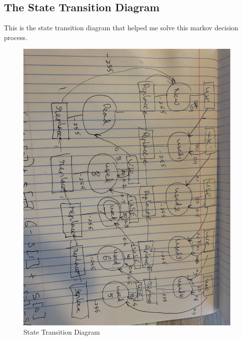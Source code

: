 \documentclass[11pt]{scrartcl} %
\begin{document}
\subsection{The State Transition Diagram}
This is the state transition diagram that helped me solve this markov decision process. 
\begin{figure}[H]
  \includegraphics[width=\linewidth]{pls.jpg}
  \caption{State Transition Diagram}
  \label{fig:boat1}
\end{figure}
\end{document}
